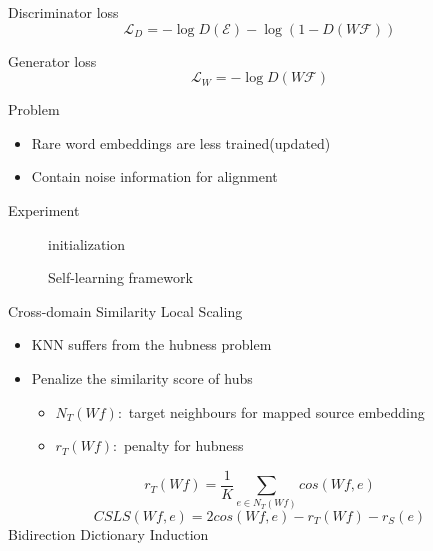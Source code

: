 \documentclass[11pt, a4paper, landscape]{article}
\begin{document}
	
	
	Discriminator loss
	\[ \mathcal{L}_D = -\log D(\mathcal{E}) - \log (1-D(W\mathcal{F}))\]
	
	
	Generator  loss 
	\[ \mathcal{L}_W = -\log D(W\mathcal{F})\]
	\vfill
	
	\NewPage
	\vfill
	Problem
	\begin{itemize}
		\item Rare word embeddings are less trained(updated)
		\item Contain noise information for alignment
	\end{itemize}
	Experiment
	\vfill
	\NewPage
	\begin{figure}[ht]
		\centering
		\begin{minipage}{.7\linewidth}
			\begin{algorithm}[H]
				\SetAlgoLined
				initialization\;
			
			\caption{Self-learning framework}
			\end{algorithm}
		\end{minipage}
	\end{figure}


	\NewPage

	\vfill
	Cross-domain Similarity Local Scaling
	\begin{itemize}
		\item KNN suffers from the hubness problem
		\item Penalize the similarity score of hubs
			\begin{itemize}
				\item $N_T(Wf):$ target neighbours for mapped source embedding
				\item $r_T(W f):$ penalty for hubness
			\end{itemize}
	\end{itemize}
	\[r_T(W f) = \frac{1}{K} \sum_{e \in N_T(Wf)}cos(Wf, e) \]
	\[ CSLS(Wf, e) = 2cos(Wf, e)-r_{T}(Wf)-r_{S}(e)\]
	Bidirection Dictionary Induction
\end{document}
